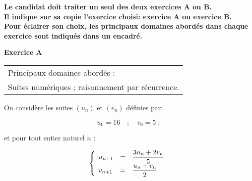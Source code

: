 \documentclass[11pt]{article}
\begin{document}
\medskip

\textbf{Le candidat doit traiter un seul des deux exercices A ou B.\\[5pt]
Il indique sur sa copie l'exercice choisi: exercice A ou exercice B.\\[5pt]Pour éclairer son choix, les principaux domaines abordés dans chaque exercice sont indiqués dans un encadré.}

\medskip

\textbf{Exercice A}

\medskip

\begin{tabular}{|l|}\hline
Principaux domaines abordés :\\
Suites numériques ; raisonnement par récurrence.\\ \hline
\end{tabular}

\medskip

On considère les suites $\left(u_n\right)$ et $\left(v_n\right)$ définies par:

\[u_0 = 16 \quad ;\quad  v_0 = 5 \;;\]

et pour tout entier naturel $n$ :

\renewcommand\arraystretch{2}
\[\left\{\begin{array}{l c l}
u_{n+1}&=&\dfrac{3u_n + 2v_n}{5}\\
v_{n+1}&=& \dfrac{u_n + v_n}{2}
\end{array}\right.\]
\renewcommand\arraystretch{1}

\smallskip
\end{document}
